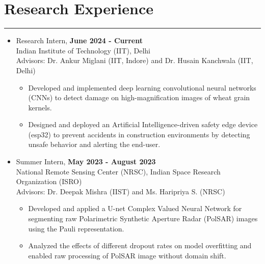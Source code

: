 \documentclass[11pt]{article}
\newlength{\sectionvspace}
\newlength{\sectionvspacee}
\begin{document}
		\vspace{\sectionvspacee}
	\section*{\bf Research Experience}
	\vspace{\sectionvspace}
	\rule{\textwidth}{0.4pt}
	\begin{itemize}[leftmargin=*,noitemsep,topsep=0pt]
		
		\item Research Intern, \hfill \textbf{June 2024 - Current} \\
		Indian Institute of Technology (IIT), Delhi \\
		Advisors: Dr. Ankur Miglani (IIT, Indore) and Dr. Husain Kanchwala (IIT, Delhi)
		\begin{itemize}[leftmargin=*,noitemsep,topsep=0pt]
			\item Developed and implemented deep learning convolutional neural networks (CNNs) to detect damage on high-magnification images of wheat grain kernels.
			\item Designed and deployed an Artificial Intelligence-driven safety edge device (esp32) to prevent accidents in construction environments by detecting unsafe behavior and alerting the end-user.
		\end{itemize}
		
		
\item Summer Intern, \hfill \textbf{May 2023 - August 2023}\\
National Remote Sensing Center (NRSC), Indian Space Research Organization (ISRO)\\
Advisors: Dr. Deepak Mishra (IIST) and Ms. Haripriya S. (NRSC)
\begin{itemize}[leftmargin=*,noitemsep,topsep=0pt]
	\item Developed and applied a U-net Complex Valued Neural Network for segmenting raw  Polarimetric Synthetic Aperture Radar (PolSAR) images using the Pauli representation.
	\item Analyzed the effects of different dropout rates on model overfitting and enabled raw processing of PolSAR image without domain shift.
\end{itemize}


\end{itemize}
\end{document}
